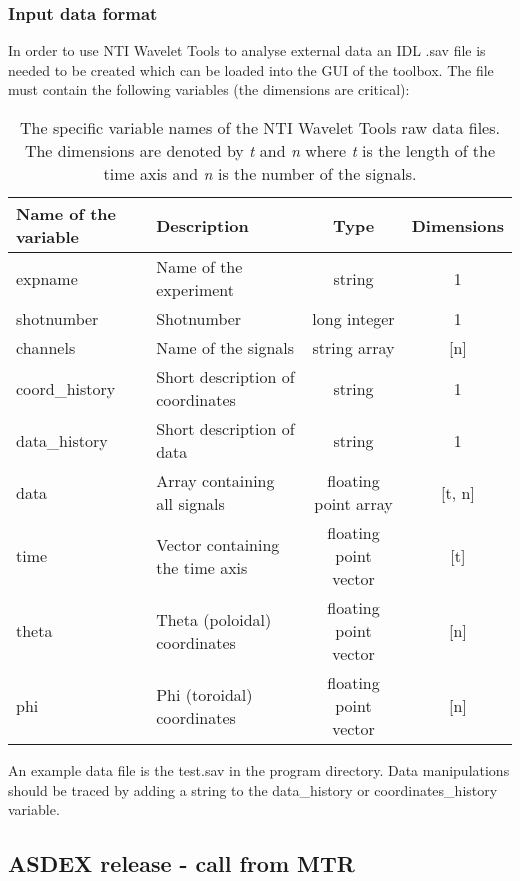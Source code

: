 \documentclass[12pt]{article}
\begin{document}
\subsubsection{Input data format}

In order to use NTI Wavelet Tools to analyse external data an IDL .sav file is needed to be created which can be loaded into the GUI of the toolbox. The file must contain the following variables (the dimensions are critical):

\begin{table}[!hb]
\begin{center}
  \footnotesize
 \begin{tabular}{|l|l|c|c|}
 \hline
  Name of the variable	& Description				& Type			& Dimensions	\\
  \hline\hline
  expname		& Name of the experiment		& string		& 1		\\\hline
  shotnumber		& Shotnumber				& long integer		& 1		\\\hline
  channels		& Name of the signals 			& string array		& [n]		\\\hline
  coord\_history	& Short description of coordinates	& string		& 1		\\\hline
  data\_history		& Short description of data		& string		& 1		\\\hline
  data			& Array containing all signals		& floating point array	& [t, n]	\\\hline
  time			& Vector containing the time axis	& floating point vector	& [t]		\\\hline
  theta			& Theta (poloidal) coordinates		& floating point vector	& [n]		\\\hline
  phi			& Phi (toroidal) coordinates		& floating point vector	& [n]		\\\hline
 \end{tabular}
 \caption{\label{tab:variables} The specific variable names of the NTI Wavelet Tools raw data files. The dimensions are denoted by \textit{t} and \textit{n} where \textit{t} is the length of the time axis and \textit{n} is the number of the signals. }
\end{center}
\end{table}

An example data file is the test.sav in the program directory. Data manipulations should be traced by adding a string to the data\_history or coordinates\_history variable.



\subsection{ASDEX release - call from MTR}
\end{document}
